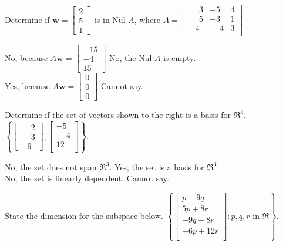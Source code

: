 \documentclass[11pt]{exam}
\begin{document}
\begin{questions}
\addpoints
\question[2]
Determine if $\mathbf{w}= \left[\begin{array}{c}2 \\ 5 \\ 1 \end{array}\right]$ is in $\text{Nul }A$, where $A=\left[\begin{array}{ccc}\phantom{-}3 & -5 & 4 \\ \phantom{-}5 & -3 & 1 \\ -4 & \phantom{-}4 & 3 \\ \end{array}\right]$

\begin{oneparchoices}
\choice No, because $A\mathbf{w}=\left[\begin{array}{c}-15 \\ -4 \\ 15 \end{array}\right]$ %
\choice No, the Nul $A$ is empty. \\
\choice Yes, because $A\mathbf{w}=\left[\begin{array}{c}0 \\ 0 \\ 0 \end{array}\right]$
\choice Cannot say.
\end{oneparchoices}
\answerline

\addpoints
\question[2]
Determine if the set of vectors shown to the right is a basis for $\Re^{3}$.\newline
$\left\{\left[\begin{array}{c} \phantom{-}2 \\ \phantom{-}3 \\ -9 \end{array}\right], \left[\begin{array}{c} -5 \\ \phantom{-}4 \\ 12 \\ \end{array}\right]\right\}$.

\begin{oneparchoices}
\choice No, the set does not span $\Re^{3}$. %
\choice Yes, the set is a basis for $\Re^{3}$.\\
\choice No, the set is linearly dependent.
\choice Cannot say.
\end{oneparchoices}
\answerline

\addpoints
\question[2]
State the dimension for the subspace below.\newline
$\left\{\left[\begin{array}{c} p-9q\\5p+8r\\-9q+8r\\-6p+12r\\ \end{array}\right]:p,q,r \text{ in } \Re \right\}$.


\end{questions}
\end{document}
